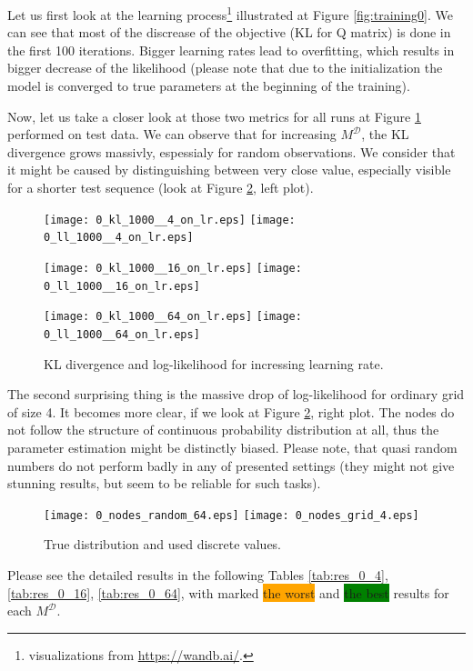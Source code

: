 \documentclass[shortabstract]{iithesis}
\begin{document}
Let us first look at the learning process\footnote{visualizations from \href{https://wandb.ai/}{https://wandb.ai/}.} illustrated at Figure \ref{fig:training0}. We can see that most of the discrease of the objective (KL for Q matrix) is done in the first 100 iterations. Bigger learning rates lead to overfitting, which results in bigger decrease of the likelihood (please note that due to the initialization the model is converged to true parameters at the beginning of the training).

Now, let us take a closer look at those two metrics for all runs at Figure \ref{fig:res0} performed on test data. We can observe that for increasing $M^{\mathcal D}$, the KL divergence grows massivly, espessialy for random observations. We consider that it might be caused by distinguishing between very close value, especially visible for a shorter test sequence (look at Figure \ref{fig:0_og_nodes_4}, left plot).


\begin{figure}[!ht]
    \centering
    \texttt{[image: 0\_kl\_1000\_\_4\_on\_lr.eps]}
    \texttt{[image: 0\_ll\_1000\_\_4\_on\_lr.eps]}
    
    \texttt{[image: 0\_kl\_1000\_\_16\_on\_lr.eps]}
    \texttt{[image: 0\_ll\_1000\_\_16\_on\_lr.eps]}
    
    \texttt{[image: 0\_kl\_1000\_\_64\_on\_lr.eps]}
    \texttt{[image: 0\_ll\_1000\_\_64\_on\_lr.eps]}
    \caption{KL divergence and log-likelihood for incressing learning rate. }
    \label{fig:res0}
\end{figure}
 
 The second surprising thing is the massive drop of log-likelihood for ordinary grid of size 4. It becomes more clear, if we look at Figure \ref{fig:0_og_nodes_4}, right plot. The nodes do not follow the structure of continuous probability distribution at all, thus the parameter estimation might be distinctly biased. Please note, that quasi random numbers do not perform badly in any of presented settings (they might not give stunning results, but seem to be reliable for such tasks). 
 
\begin{figure}[!ht]
    \centering
    \texttt{[image: 0\_nodes\_random\_64.eps]}
    \texttt{[image: 0\_nodes\_grid\_4.eps]}
    \caption{True distribution and used discrete values.}
    \label{fig:0_og_nodes_4}
\end{figure}


Please see the detailed results in the following Tables \ref{tab:res_0_4}, \ref{tab:res_0_16}, \ref{tab:res_0_64},  with marked \colorbox{orange}{the worst} and \colorbox{green}{the best} results for each $M^{\mathcal D}$.
\end{document}

